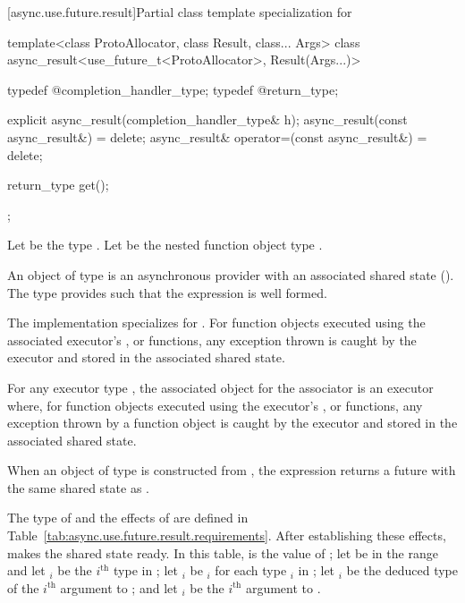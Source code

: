 [async.use.future.result]{Partial class template specialization 
        for }

\begin{codeblock}
template<class ProtoAllocator, class Result, class... Args>
class async_result<use_future_t<ProtoAllocator>, Result(Args...)>
{
  typedef @\seebelow@ completion_handler_type;
  typedef @\seebelow@ return_type;

  explicit async_result(completion_handler_type& h);
  async_result(const async_result&) = delete;
  async_result& operator=(const async_result&) = delete;

  return_type get();
};
\end{codeblock}

\pnum
Let  be the type . Let  be the nested function object type .

\pnum
An object  of type  is an asynchronous provider with an associated shared state (). The type  provides  such that the expression  is well formed.

\pnum
The implementation specializes  for . For function objects executed using the associated executor's ,  or  functions, any exception thrown is caught by the executor and stored in the associated shared state.

\pnum
For any executor type , the associated object for the associator  is an executor where, for function objects executed using the executor's ,  or  functions, any exception thrown by a function object is caught by the executor and stored in the associated shared state.

\pnum
When an object  of type  is constructed from , the expression  returns a future with the same shared state as .

\pnum
The type of  and the effects of  are defined in Table~\ref{tab:async.use.future.result.requirements}. After establishing these effects,  makes the shared state ready. In this table,  is the value of ; let  be in the range  and let $_i$ be the $i^\text{th}$ type in ; let $_i$ be $_i$\tcode{>} for each type $_i$ in ; let $_i$ be the deduced type of the $i^\text{th}$ argument to ; and let $_i$ be the $i^\text{th}$ argument to .

